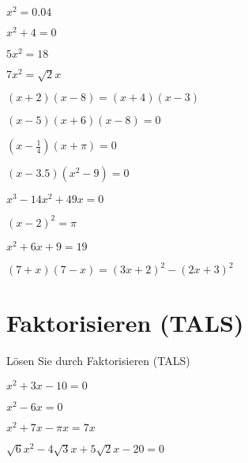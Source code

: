 \begin{bbwAufgabenBlock}
\item $x^2 = 0.04$

\item $ x^2 + 4= 0$
\LoesungsBlock{$\lx= \left\{ \right\}$}

\item $ 5x^2= 18$

\item $ 7x^2= \sqrt{2} x$

\item $ (x+2)(x-8) = (x+4)(x-3)$

\item $ (x-5) (x+6) (x-8)= 0$

\item $ (x-\frac14)(x+\pi)= 0$

\item $ (x-3.5)(x^2-9)= 0$

\item $ x^3 -14x^2 + 49x=  0$

\item $ (x-2)^2= \pi$

\item $x^2 + 6x + 9 = 19$

\item $ (7+x)(7-x)= (3x+2)^2 - (2x + 3)^2$

\end{bbwAufgabenBlock}
\newpage

\section{Faktorisieren (TALS)}
Lösen Sie durch Faktorisieren (TALS)

\begin{bbwAufgabenBlock}
\item $ x^2 + 3x - 10= 0$

\item $ x^2 - 6x= 0$

\item $ x^2 + 7x -\pi x= 7x$

\item $ \sqrt{6}x^2 - 4\sqrt{3}x + 5\sqrt{2}x - 20= 0$
\LoesungsBlock{$\lx= \left\{ ;  \right\}$}


\end{bbwAufgabenBlock}
\newpage



